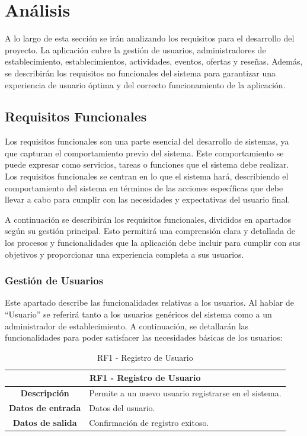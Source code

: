 \chapter{Análisis}

A lo largo de esta sección se irán analizando los requisitos para el desarrollo del proyecto. La aplicación cubre la gestión de usuarios, administradores de establecimiento, establecimientos, actividades, eventos, ofertas y reseñas. Además, se describirán los requisitos no funcionales del sistema para garantizar una experiencia de usuario óptima y del correcto funcionamiento de la aplicación.

\section{Requisitos Funcionales}

Los requisitos funcionales son una parte esencial del desarrollo de sistemas, ya que capturan el comportamiento previo del sistema. Este comportamiento se puede expresar como servicios, tareas o funciones que el sistema debe realizar. Los requisitos funcionales se centran en lo que el sistema hará, describiendo el comportamiento del sistema en
términos de las acciones específicas que debe llevar a  cabo para cumplir con las necesidades y expectativas del usuario final. \cite{malan_bredemeyer}

A continuación se describirán los requisitos funcionales, divididos en apartados según su gestión principal. Esto permitirá una comprensión clara y detallada de los procesos y funcionalidades que la aplicación debe incluir para cumplir con sus objetivos y proporcionar una experiencia completa a sus usuarios.


\subsection{Gestión de Usuarios}

Este apartado describe las funcionalidades relativas a los usuarios. Al hablar de “Usuario” se referirá tanto a los usuarios genéricos del sistema como a un administrador de establecimiento. A continuación, se detallarán las funcionalidades para poder satisfacer las necesidades básicas de los usuarios:

\begin{table}[H]
    \centering
    \begin{tabular}{|c|p{10cm}|}
        \hline
        \multicolumn{2}{|c|}{\textbf{RF1 - Registro de Usuario}}                          \\
        \hline
        \textbf{Descripción}      & Permite a un nuevo usuario registrarse en el sistema. \\
        \hline
        \textbf{Datos de entrada} & Datos del usuario.                                    \\
        \hline
        \textbf{Datos de salida}  & Confirmación de registro exitoso.                     \\
        \hline
    \end{tabular}
    \caption{RF1 - Registro de Usuario}
\end{table}

